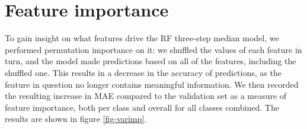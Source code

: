 \documentclass[review,authoryear,3p]{elsarticle}
\begin{document}
\section{Feature importance} \label{sec-varimp}


To gain insight on what features drive the \gls{RF} three-step median model, we performed permutation importance on it:
we shuffled the values of each feature in turn, and the model made predictions based on all of the features, including the shuffled one.
This results in a decrease in the accuracy of predictions, as the feature in question no longer contains meaningful information.
We then recorded the resulting increase in \gls{MAE} compared to the validation set as a measure of feature importance, both per class and overall for all classes combined.
%
The results are shown in figure \ref{fig-varimp}.
\end{document}
